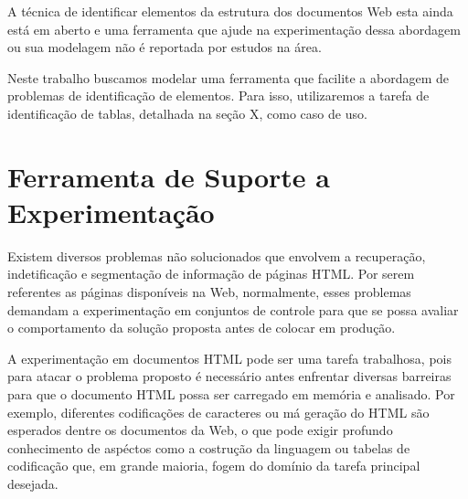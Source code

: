 \documentclass{acm_proc_article-sp}
\newcommand{\remove}[1]{}
\numberwithin{equation}{section}
\begin{document}
A técnica de identificar elementos da estrutura dos documentos Web esta
ainda está em aberto e uma ferramenta que ajude na experimentação dessa
abordagem ou sua modelagem não é reportada por estudos na área.

Neste trabalho buscamos modelar uma ferramenta que facilite a abordagem
de problemas de identificação de elementos. Para isso,
utilizaremos a tarefa de identificação de tablas, detalhada na seção X,
como caso de uso.

\remove{
Embora estudos como \cite{}... apresentem resutados "interessantes" na detecção de templates, 
}


\section{Ferramenta de Suporte a Experimentação}


Existem diversos problemas não solucionados que envolvem a
recuperação, indetificação e segmentação de 
informação de páginas HTML. Por serem referentes as
páginas disponíveis na Web, normalmente, esses problemas demandam a
experimentação em conjuntos de controle para que se possa avaliar o
comportamento da solução proposta antes de colocar em produção.


A experimentação em documentos HTML pode ser uma tarefa trabalhosa, pois
para atacar o problema proposto é necessário antes enfrentar diversas
barreiras para que o documento HTML possa ser carregado em memória e
analisado. Por exemplo, diferentes codificações de caracteres ou má geração do
HTML são esperados dentre os documentos da Web, o que pode 
exigir profundo conhecimento de aspéctos como a costrução da linguagem ou
tabelas de codificação que, em grande maioria, fogem do domínio da tarefa
principal desejada.

\end{document}
